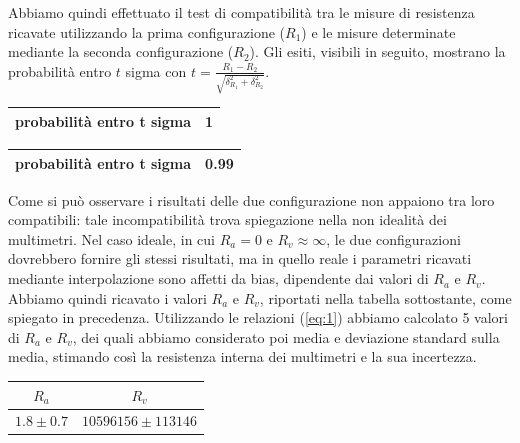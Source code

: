 \documentclass[a4paper]{article}
\begin{document}
Abbiamo quindi effettuato il test di compatibilità tra le misure di resistenza ricavate utilizzando la prima configurazione (\(R_1\)) e le misure determinate mediante la seconda configurazione (\(R_2\)). Gli esiti, visibili in seguito, mostrano la probabilità entro \(t\) sigma con \( t = \frac {R_1 - R_2}{\sqrt{\delta_{R_1}^2+\delta_{R_2}^2}} \).

\begin{center}
\begin{tabular}{|l|c|}
\hline
probabilità entro t sigma & 1 \\
\hline
\end{tabular}
\end{center}

\begin{center}
\begin{tabular}{|l|c|}
\hline
probabilità entro t sigma & 0.99 \\
\hline
\end{tabular}
\end{center}

Come si può osservare i risultati delle due configurazione non appaiono tra loro compatibili: tale incompatibilità trova spiegazione nella non idealità dei multimetri. Nel caso ideale, in cui \(R_a = 0\) e \(R_v \approx \infty\), le due configurazioni dovrebbero fornire gli stessi risultati, ma in quello reale i parametri ricavati mediante interpolazione sono affetti da bias, dipendente dai valori di \(R_a\) e \(R_v\). 
Abbiamo quindi ricavato i valori \(R_a\) e \(R_v\), riportati nella tabella sottostante, come spiegato in precedenza. Utilizzando le relazioni (\ref{eq:1}) abbiamo calcolato 5 valori di \(R_a\) e \(R_v\), dei quali abbiamo considerato poi media e deviazione standard sulla media, stimando così la resistenza interna dei multimetri e la sua incertezza. 

\begin{center}
\begin{tabular}{|c|c|}
\hline
$R_a$ & $R_v$ \\
\hline
$1.8 \pm 0.7$ & $10596156 \pm 113146$ \\
\hline
\end{tabular}
\end{center}
\end{document}

